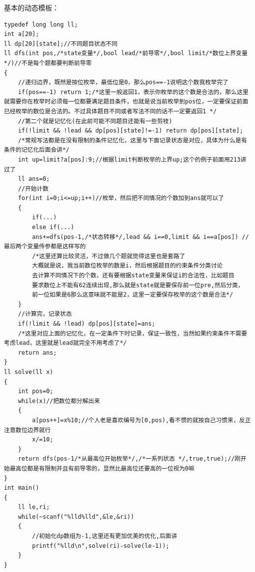 \documentclass{article}
\theoremstyle{nonumberplain}
\begin{document}
	基本的动态模板：
	\begin{verbatim}
typedef long long ll;  
int a[20];  
ll dp[20][state];//不同题目状态不同  
ll dfs(int pos,/*state变量*/,bool lead/*前导零*/,bool limit/*数位上界变量*/)//不是每个题都要判断前导零  
{  
    //递归边界，既然是按位枚举，最低位是0，那么pos==-1说明这个数我枚举完了  
    if(pos==-1) return 1;/*这里一般返回1，表示你枚举的这个数是合法的，那么这里就需要你在枚举时必须每一位都要满足题目条件，也就是说当前枚举到pos位，一定要保证前面已经枚举的数位是合法的。不过具体题目不同或者写法不同的话不一定要返回1 */  
    //第二个就是记忆化(在此前可能不同题目还能有一些剪枝)  
    if(!limit && !lead && dp[pos][state]!=-1) return dp[pos][state];  
    /*常规写法都是在没有限制的条件记忆化，这里与下面记录状态是对应，具体为什么是有条件的记忆化后面会讲*/  
    int up=limit?a[pos]:9;//根据limit判断枚举的上界up;这个的例子前面用213讲过了  
    ll ans=0;  
    //开始计数  
    for(int i=0;i<=up;i++)//枚举，然后把不同情况的个数加到ans就可以了  
    {  
        if(...)
        else if(...)  
        ans+=dfs(pos-1,/*状态转移*/,lead && i==0,limit && i==a[pos]) //最后两个变量传参都是这样写的  
        /*这里还算比较灵活，不过做几个题就觉得这里也是套路了 
        大概就是说，我当前数位枚举的数是i，然后根据题目的约束条件分类讨论 
        去计算不同情况下的个数，还有要根据state变量来保证i的合法性，比如题目 
        要求数位上不能有62连续出现,那么就是state就是要保存前一位pre,然后分类， 
        前一位如果是6那么这意味就不能是2，这里一定要保存枚举的这个数是合法*/  
    }  
    //计算完，记录状态  
    if(!limit && !lead) dp[pos][state]=ans;  
    /*这里对应上面的记忆化，在一定条件下时记录，保证一致性，当然如果约束条件不需要考虑lead，这里就是lead就完全不用考虑了*/  
    return ans;  
}  
ll solve(ll x)  
{  
    int pos=0;  
    while(x)//把数位都分解出来  
    {  
        a[pos++]=x%10;//个人老是喜欢编号为[0,pos),看不惯的就按自己习惯来，反正注意数位边界就行  
        x/=10;  
    }  
    return dfs(pos-1/*从最高位开始枚举*/,/*一系列状态 */,true,true);//刚开始最高位都是有限制并且有前导零的，显然比最高位还要高的一位视为0嘛  
}  
int main()  
{  
    ll le,ri;  
    while(~scanf("%lld%lld",&le,&ri))  
    {  
        //初始化dp数组为-1,这里还有更加优美的优化,后面讲  
        printf("%lld\n",solve(ri)-solve(le-1));  
    }  
}  
\end{verbatim}
\end{document}
